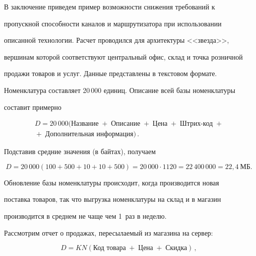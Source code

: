   


  В заключение приведем пример возможности снижения требований к 


пропускной способности каналов и маршрутизатора при использовании 


описанной технологии. Расчет проводился для архитектуры <<звезда>>, 


вершинам которой соответствуют центральный офис, склад и точка розничной 


продажи товаров и услуг. Данные представлены в текстовом формате.


  


  Номенклатура составляет 20\,000 единиц. Описание всей базы номенклатуры 


составит примерно


\begin{multline*}


    D = 20\,000 


(\mbox{Название}\;+\;\mbox{Описание}\;+\;\mbox{Цена}\;+\;


    \mbox{Штрих-код}\;+{}\\


    {}+\;\mbox{Дополнительная\ информация})\,.


    \end{multline*}


  Подставив средние значения (в байтах), получаем


  $$


    D = 20\,000  (100 + 500 + 10 + 10 + 500) = 20\,000 \cdot 1120 = 


22\,400\,000 = 22{,}4~\mbox{МБ}.


    $$


  


  Обновление базы номенклатуры происходит, когда производится новая 


поставка товаров, так что выгрузка номенклатуры на склад и в магазин 


производится в среднем не чаще чем 1~раз в неделю.


  


  Рассмотрим отчет о продажах, пересылаемый из магазина на сервер:


  $$


    D = K  N  (\mbox{Код\ 


товара}\;+\;\mbox{Цена}\;+\;\mbox{Скидка})\,,


    $$


